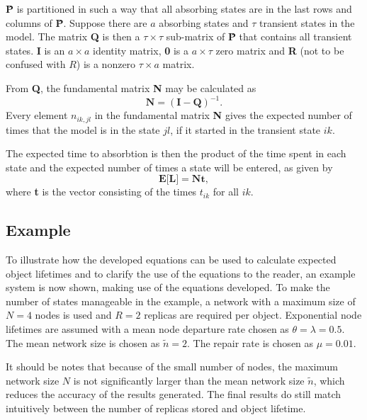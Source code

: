 \textbf{\^{P}} is partitioned in such a way that all absorbing states are in the last rows and columns of \textbf{\^{P}}. Suppose there are $a$ absorbing states and $\tau$ transient states in the model. The matrix \textbf{Q} is then a $\tau\times\tau$ sub-matrix of \textbf{\^{P}} that contains all transient states. \textbf{I} is an $a \times a$ identity matrix, \textbf{0} is a $a\times\tau$ zero matrix and \textbf{R} (not to be confused with $R$) is a nonzero $\tau\times a$ matrix.

From \textbf{Q}, the fundamental matrix \textbf{N} may be calculated as \cite{grinstead1997introduction_probability}
%
\begin{equation} \label{eq_fundamental_mat}
    \textbf{N} = (\textbf{I} - \textbf{Q})^{-1}.
\end{equation}
%
Every element $n_{ik,jl}$ in the fundamental matrix \textbf{N} gives the expected number of times that the model is in the state $jl$, if it started in the transient state $ik$.

The expected time to absorbtion is then the product of the time spent in each state and the expected number of times a state will be entered, as given by
%
\begin{equation} \label{expected_lifetime}
    \textbf{E[L]} = \textbf{Nt},
\end{equation}
%
where \textbf{t} is the vector consisting of the times $t_{ik}$ for all $ik$.

\subsection{Example}

To illustrate how the developed equations can be used to calculate expected object lifetimes and to clarify the use of the equations to the reader, an example system is now shown, making use of the equations developed. To make the number of states manageable in the example, a network with a maximum size of $N=4$ nodes is used and $R=2$ replicas are required per object. Exponential node lifetimes are assumed with a mean node departure rate chosen as $\theta = \lambda = 0.5$. The mean network size is chosen as $\tilde{n} = 2$. The repair rate is chosen as $\mu = 0.01$.

It should be notes that because of the small number of nodes, the maximum network size $N$ is not significantly larger than the mean network size $\tilde{n}$, which reduces the accuracy of the results generated. The final results do still match intuitively between the number of replicas stored and object lifetime.

